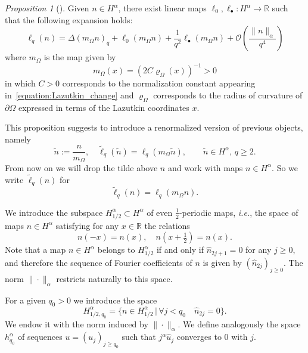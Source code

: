 \documentclass[12pt, openany]{amsart}
\theoremstyle{definition}
\theoremstyle{remark}
\theoremstyle{remark}
\theoremstyle{theorem}
\theoremstyle{theorem}
\theoremstyle{theorem}
\newtheorem{proposition}[theorem]{Proposition}
\theoremstyle{theorem}
\newcommand{\bigo}[1]{\mathcal{O}\left(#1\right)}
\newcommand{\RR}{\mathbb{R}}
\begin{document}
\begin{proposition}[\cite{DKW}]
\label{proposition:asymptotics_DKW}
Given $n\in H^{\alpha}$, there exist linear maps $\ell_0, \ell_{\bullet}:H^\alpha\to\RR$ such that the following expansion holds:
\begin{equation}
\label{equation:asymptotics_ell}
\ell_q(n) = \Delta(m_{\Omega}n)_q+\ell_0(m_{\Omega} n)+\frac{1}{q^2}\ell_{\bullet}(m_{\Omega} n) +\bigo{\frac{\|n\|_{\alpha}}{q^4}}
\end{equation}
where $m_{\Omega}$ is the map given by
\begin{equation}
\label{equation:asymptotics_ell_2}
m_{\Omega}(x) = \left(2C\varrho_{\Omega}(x)\right)^{-1}>0
\end{equation}
in which $C>0$ corresponds to the normalization constant appearing in~\eqref{equation:Lazutkin_change} and $\varrho_{\Omega}$ corresponds to the radius of curvature of $\partial\Omega$ expressed in terms of the Lazutkin coordinates $x$.
\end{proposition}

This proposition suggests to introduce a renormalized version of previous objects, namely 
\[
\tilde n := \frac{n}{m_{\Omega}},
\quad
\tilde \ell_q(\tilde n) = \ell_q(m_{\Omega}\tilde n),\qquad \tilde n\in H^\alpha,\, q\geq 2.
\]
From now on we will drop the tilde above $n$ and work with maps $n\in H^{\alpha}$. So we write $\tilde\ell_q(n)$ for
\[
\tilde \ell_q(n) = \ell_q(m_{\Omega}n).
\]


We introduce the subspace $H^{\alpha}_{1/2}\subset H^{\alpha}$ of even $\tfrac{1}{2}$-periodic maps, \textit{i.e.}, the space of maps $n\in H^{\alpha}$ satisfying for any $x\in\RR$ the relations
\[
n(-x) = n(x),\quad n(x+\tfrac{1}{2}) = n(x).
\]
Note that a map $n\in H^{\alpha}$ belongs to $H^{\alpha}_{1/2}$ if and only if $\widehat n_{2j+1}=0$ for any $j\geq 0$, and therefore the sequence of Fourier coefficients of $n$ is given by $(\widehat n_{2j})_{j\geq 0}$. The norm $\|\cdot\|_{\alpha}$ restricts naturally to this space.


For a given $q_0>0$ we introduce the space 
\[
H^{\alpha}_{1/2,q_0} = \{n\in H^{\alpha}_{1/2}\,|\, \forall j< q_0\quad \widehat n_{2j}=0\}.
\]
We endow it with the norm induced by $\|\cdot\|_{\alpha}$. We define analogously the space $h^{\alpha}_{q_0}$ of sequences $u=(u_j)_{j\geq q_0}$ such that $j^{\alpha}\widehat u_{j}$ converges to $0$ with $j$.
\end{document}
